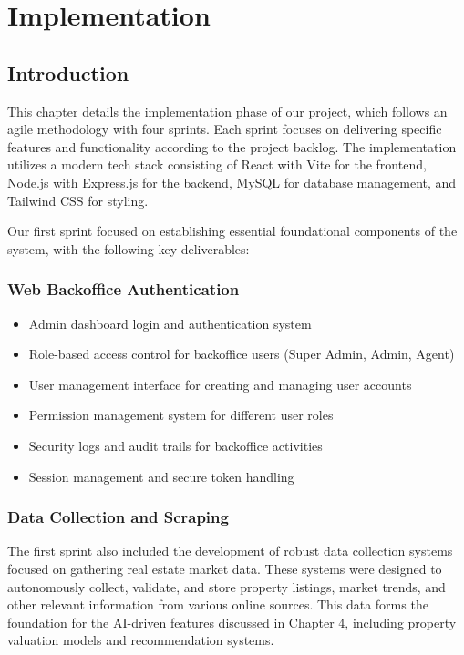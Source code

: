 \chapter{Implementation}

\section{Introduction}
This chapter details the implementation phase of our project, which follows an agile methodology with four sprints. Each sprint focuses on delivering specific features and functionality according to the project backlog. The implementation utilizes a modern tech stack consisting of React \cite{ReactWebsite} with Vite \cite{ViteJSWebsite} for the frontend, Node.js \cite{NodeJSWebsite} with Express.js \cite{ExpressJSWebsite} for the backend, MySQL \cite{MySQLWebsite} for database management, and Tailwind CSS \cite{TailwindWebsite} for styling.

Our first sprint focused on establishing essential foundational components of the system, with the following key deliverables:

\subsection{Web Backoffice Authentication}
\begin{itemize}
    \item Admin dashboard login and authentication system
    \item Role-based access control for backoffice users (Super Admin, Admin, Agent)
    \item User management interface for creating and managing user accounts
    \item Permission management system for different user roles
    \item Security logs and audit trails for backoffice activities
    \item Session management and secure token handling
\end{itemize}

\subsection{Data Collection and Scraping}
The first sprint also included the development of robust data collection systems focused on gathering real estate market data. These systems were designed to autonomously collect, validate, and store property listings, market trends, and other relevant information from various online sources. This data forms the foundation for the AI-driven features discussed in Chapter 4, including property valuation models and recommendation systems.

